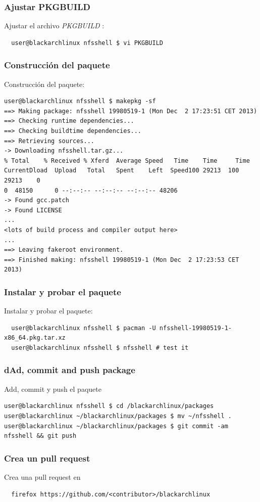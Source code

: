 \documentclass[a4paper, oneside, 11pt]{book}
\def\href#1#2{\htmladdnormallink{#2}{#1}}
\begin{document}
\subsubsection{Ajustar PKGBUILD}
Ajustar el archivo \textit{PKGBUILD} :
\begin{lstlisting}
  user@blackarchlinux nfsshell $ vi PKGBUILD
\end{lstlisting}

\subsubsection{Construcci\'on del paquete}
Construcci\'on del paquete:
\begin{lstlisting}user@blackarchlinux nfsshell $ makepkg -sf
==> Making package: nfsshell 19980519-1 (Mon Dec  2 17:23:51 CET 2013)
==> Checking runtime dependencies...
==> Checking buildtime dependencies...
==> Retrieving sources...
-> Downloading nfsshell.tar.gz...
% Total    % Received % Xferd  Average Speed   Time    Time     Time
CurrentDload  Upload   Total   Spent    Left  Speed100 29213  100 29213    0
0  48150      0 --:--:-- --:--:-- --:--:-- 48206
-> Found gcc.patch
-> Found LICENSE
...
<lots of build process and compiler output here>
...
==> Leaving fakeroot environment.
==> Finished making: nfsshell 19980519-1 (Mon Dec  2 17:23:53 CET 2013)
\end{lstlisting}

\subsubsection{Instalar y probar el paquete}
Instalar y probar el paquete:
\begin{lstlisting}
  user@blackarchlinux nfsshell $ pacman -U nfsshell-19980519-1-x86_64.pkg.tar.xz
  user@blackarchlinux nfsshell $ nfsshell # test it
\end{lstlisting}

\subsubsection{dAd, commit and push package}
Add, commit y push el paquete
\begin{lstlisting}user@blackarchlinux nfsshell $ cd /blackarchlinux/packages
user@blackarchlinux ~/blackarchlinux/packages $ mv ~/nfsshell .
user@blackarchlinux ~/blackarchlinux/packages $ git commit -am nfsshell && git push
\end{lstlisting}

\subsubsection{Crea un pull request}
Crea una pull request en \href{https://github.com/}{github.com}
\begin{lstlisting}
  firefox https://github.com/<contributor>/blackarchlinux
\end{lstlisting}
\end{document}
